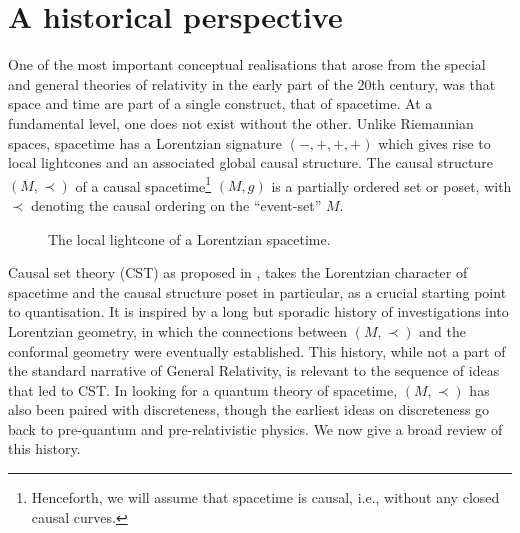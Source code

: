  


 \section{A historical perspective}
\label{sec:history} 

One of the most important conceptual realisations that arose from the
special and general theories of relativity in the early part of the 20th century, was that space and
time are part of a single construct, that of spacetime.  At a
fundamental level, one does not exist without the other. Unlike
Riemannian spaces, spacetime has a Lorentzian signature $(-, +,+,+)$ which
gives rise to local lightcones and an associated  global causal
structure. The causal structure $(M,\prec)$ of a  causal spacetime\footnote{Henceforth, we will assume that
  spacetime is causal, i.e., without any closed causal curves.} $(M,g)$ is a partially ordered set or poset, with
$\prec$ denoting the causal ordering on the ``event-set'' $M$. 

\begin{figure}[ht]
\centering {}
\caption{The local lightcone of a Lorentzian spacetime.}
\end{figure}


Causal set theory (CST) as proposed in \cite{blms}, takes the Lorentzian
character of spacetime and the causal structure poset in particular, as a crucial starting point to
quantisation. It is inspired by a long but sporadic history of investigations into
Lorentzian geometry, in which the connections between $(M,\prec)$
and the conformal geometry were eventually established. This history, while not a part of the
standard narrative of General Relativity, is relevant to the sequence
of ideas that led to CST. In looking for a quantum theory of spacetime, $(M,\prec)$ has also been paired with
discreteness, though the earliest ideas on discreteness go back to pre-quantum and pre-relativistic physics. We now give a
broad review of this history. 

